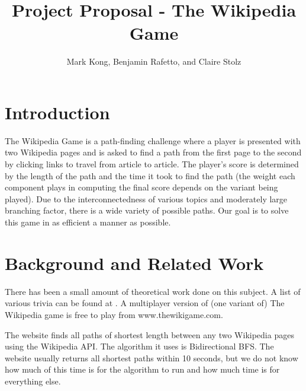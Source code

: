 \documentclass[11pt]{article}
\title{Project Proposal - The Wikipedia Game}
\author{Mark Kong, Benjamin Rafetto, and Claire Stolz}
\begin{document}
\maketitle{}


\section{Introduction}

The Wikipedia Game is a path-finding challenge where a player is presented with two Wikipedia pages and is asked to find a path from the first page to the second by clicking links to travel from article to article. The player's score is determined by the length of the path and the time it took to find the path (the weight each component plays in computing the final score depends on the variant being played). Due to the interconnectedness of various topics and moderately large branching factor,%
there is a wide variety of possible paths. Our goal is to solve this game in as efficient a manner as possible.


\section{Background and Related Work}

There has been a small amount of theoretical work done on this subject. A list of various trivia can be found at \cite{https://en.wikipedia.org/wiki/Wikipedia:Six_degrees_of_Wikipedia}.  A multiplayer version of (one variant of) The Wikipedia game is free to play from www.thewikigame.com.

The website \cite{www.sixdegreesofwikipedia.com} finds all paths of shortest length between any two Wikipedia pages using the Wikipedia API.  The algorithm it uses is Bidirectional BFS.  The website usually returns all shortest paths within 10 seconds, but we do not know how much of this time is for the algorithm to run and how much time is for everything else.
\end{document}
